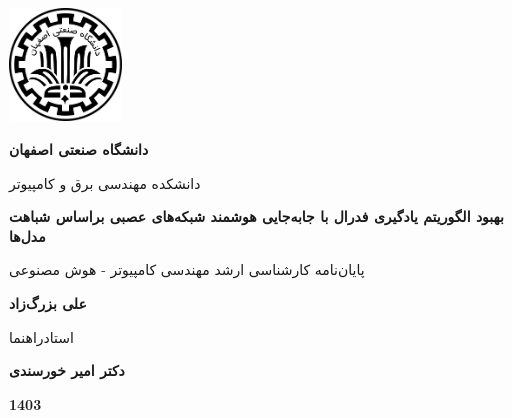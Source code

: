 



\thispagestyle{empty}
\begin{center}
\includegraphics[height=3cm]{iut_logo.png}
\vspace{0.4cm}

\textbf{دانشگاه صنعتی اصفهان}\\
\vspace{0.4cm}

{\large

	دانشکده مهندسی برق و کامپیوتر
}
\vspace{3.5cm}

{\LARGE
	\textbf{
	بهبود الگوریتم یادگیری فدرال با جابه‌جایی هوشمند شبکه‌های عصبی براساس شباهت مدل‌ها
	}
	\\
}
\vspace{3.5cm}

{\large
	پایان‌نامه کارشناسی ارشد مهندسی کامپیوتر - هوش مصنوعی
}
\vspace{1cm}

{\Large
	\textbf{علی بزرگ‌زاد}\\
}
\vspace{2.5cm}

{\large
	استادراهنما\\
}
\vspace{0.5cm}

{\Large
	\textbf{دکتر امیر خورسندی}\\
}
\vspace{3.34cm}

\textbf{1403}

\end{center}
\restoregeometry
\pagebreak

